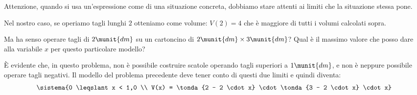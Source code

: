
\begin{osservazione}{}{}
Attenzione, quando si usa un'espressione come  di una 
situazione concreta, dobbiamo stare attenti ai limiti che la situazione 
stessa pone.
\end{osservazione}

Nel nostro caso, se operiamo tagli lunghi \(2\) otteniamo come volume: 
\(V(2) = 4\) che è maggiore di tutti i volumi calcolati sopra.

Ma ha senso operare tagli di \(2\munit{dm}\) su un cartoncino di 
\(2\munit{dm} \times 3\munit{dm}\)?
Qual è il massimo valore che posso dare alla variabile \(x\) per questo 
particolare modello?

È evidente che, in questo problema, non è possibile costruire scatole 
operando tagli superiori a \(1\munit{dm}\), e non è neppure possibile 
operare tagli negativi. 
Il modello del problema precedente deve tener conto di questi due limiti 
e quindi diventa:
\[\sistema{0 \leqslant x < 1,0 \\ 
    V(x) = \tonda{2 - 2 \cdot x} \cdot \tonda{3 - 2 \cdot x} \cdot x}
\]

